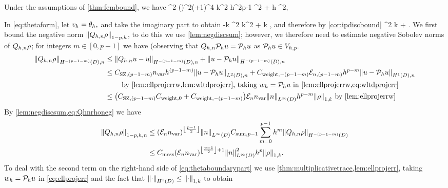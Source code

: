 \label{lem:boundarybound}
Under the assumptions of \cref{thm:fembound}, we have
\beq\label{eq:boundarybound}
\NLtGI{\thetah}^2 \leq \Cboundaryo \mleft(\En\nvar\mright)^{2\mleft(+1\mright)}^4 k^2 h^{2p-1} ^2 + \Cboundaryt h \NW{\rho}^2,
\eeq
\ele

In \cref{eq:thetaform}, let $v_{h} = \theta_{h},$ and take the imaginary part to obtain
\beqs
-k \NLtGI{\thetah}^2 \leq \Im k^2 \IPLtDn{\Qhn \rho}{\thetah} + \Re k \IPLtGI{\rho}{\thetah},
\eeqs
and therefore by \cref{cor:ipdiscbound}
\beq
\NLtGI{\thetah}^2 \leq  k  + \NLtGI{\rho}\NLtGI{\thetah}.\label{eq:thetaboundarypart}
\eeq
We first bound the negative norm $\Nfn{1-p,h}{\Qhn\rho}$, to do this we use \cref{lem:negdiscsum}; however, we therefore need to estimate negative Sobolev norms of $Q_{h,n}\rho$; for integers $m \in [0,p-1]$ we have (observing that $Q_{h,n} \mathcal P_{h} u = \mathcal P_{h} u$ as $\mathcal P_{h} u \in V_{h,p}.$
\begin{align}
\NHnfn{-(p-1-m)}{D}{\Qhn\rho} &\leq \NHnfn{-(p-1-m)}{D}{\Qhn u - u} + \NHnfn{-(p-1-m)}{D}{u - \Ph u}\nonumber\\
&\leq \CSZfn{(p-1-m)} \nvar h^{(p-1-m)} \NLtDn{u-\Ph u} + \Cwfn{-(p-1-m)}\errn{(p-1-m)} h^{p-m} \NHoDn{u - \Ph u}\nonumber\\
&\quad\quad\text{ by \cref{lem:ellprojerrw,lem:wltdprojerr}, taking } \wh = \Ph u \text{ in \cref{lem:ellprojerrw,eq:wltdprojerr}}\nonumber\\
&\leq \mleft(\CSZfn{(p-1-m)} \Cwfn{0} + \Cwfn{-(p-1-m)}\mright)\En\nvar\NLiD{n} h^{p-m} \NW{\rho} \text{ by \cref{lem:ellprojerrw}}\label{eq:Qhnrhoneg}
\end{align}
By \cref{lem:negdiscsum,eq:Qhnrhoneg} we have
\begin{align}
\Nfn{1-p,h,n}{\Qhn \rho}&\leq \mleft(\En\nvar\mright)^{\floor{\frac{p-1}2}}\NLiD{n} \Csumfn{p-1} \sum_{m=0}^{p-1} h^{m} \NHfn{-(p-1-m)}{D}{\Qhn \rho} \nonumber\\
&\leq \Cmess \mleft(\En\nvar\mright)^{\floor{\frac{p-1}2}+1}\NLiD{n}^2 h^p \NW{\rho}.\label{eq:Qhnrhosum}
\end{align}
To deal with the second term on the right-hand side of \cref{eq:thetaboundarypart} we use \cref{thm:multiplicativetrace,lem:ellprojerr}, taking $w_{h} = \mathcal P_{h} u$ in \cref{eq:ellprojerr} and the fact that $\NHoD{\cdot} \leq \NW{\cdot}$ to obtain
